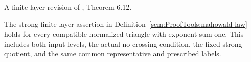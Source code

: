 \begin{theorem}
\label{paper:6.12}
A finite-layer revision of \cite{LWX126}, Theorem 6.12.\par
The strong finite-layer assertion in Definition~\ref{sem:ProofTools:mahowald-law} holds for every compatible normalized triangle with exponent sum one. This includes both input levels, the actual no-crossing condition, the fixed strong quotient, and the same common representative and prescribed labels.
\sketch
{}
\end{theorem}
